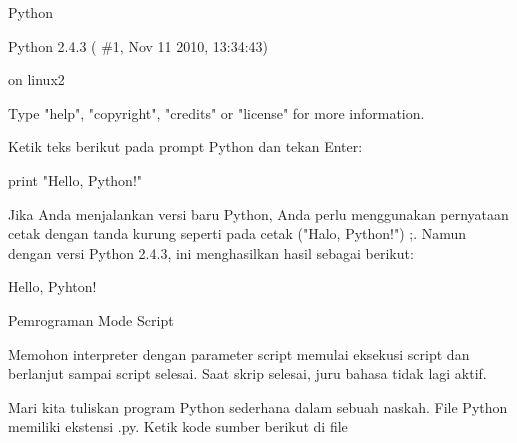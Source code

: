 {\fontsize{14pt}{14pt}\selectfont Python \\} \par
\vspace{14pt}
\noindent 
{\fontsize{14pt}{14pt}\selectfont Python 2.4.3 ( $  \#  $1, Nov 11 2010, 13:34:43) \\} \par
\noindent 
{\fontsize{14pt}{14pt} on linux2 \\} \par
\noindent 
{\fontsize{14pt}{14pt}\selectfont Type "help", "copyright", "credits" or "license" for more information. \\} \par
\vspace{14pt}
\noindent 
{\fontsize{14pt}{14pt}\selectfont Ketik teks berikut pada prompt Python dan tekan Enter: \\} \par
\vspace{14pt}
\noindent 
{\fontsize{14pt}{14pt}\selectfont print "Hello, Python!" \\} \par
\vspace{14pt}
\noindent 
{\fontsize{14pt}{14pt}\selectfont Jika Anda menjalankan versi baru Python, Anda perlu menggunakan pernyataan cetak dengan tanda kurung seperti pada cetak ("Halo, Python!") ;. Namun dengan versi Python 2.4.3, ini menghasilkan hasil sebagai berikut: \\} \par
\vspace{14pt}
\noindent 
{\fontsize{14pt}{14pt}\selectfont Hello, Pyhton! \\} \par
\vspace{14pt}
\noindent 
{\fontsize{14pt}{14pt}\selectfont Pemrograman Mode Script \\} \par
\noindent 
{\fontsize{14pt}{14pt}\selectfont Memohon interpreter dengan parameter script memulai eksekusi script dan berlanjut sampai script selesai. Saat skrip selesai, juru bahasa tidak lagi aktif. \\} \par
\vspace{14pt}
\noindent 
{\fontsize{14pt}{14pt}\selectfont Mari kita tuliskan program Python sederhana dalam sebuah naskah. File Python memiliki ekstensi .py. Ketik kode sumber berikut di file \\} \par
